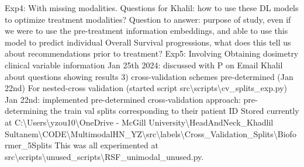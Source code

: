 \documentclass{article}%
\begin{document}
\newline%
\newline%
%
Exp4:  With missing modalities. %
\newline%
\newline%
%
Questions for Khalil: how to use these DL models to optimize treatment modalities? %
\newline%
\newline%
%
Question to answer: purpose of study, even if we were to use the pre{-}treatment information embeddings, and able to use this model to predict individual Overall Survival progressions, what does this tell us about recommendations prior to treatment? %
\newline%
\newline%
%
Exp5: Involving %
\newline%
\newline%
%
Obtaining dosimetry clinical variable information %
\newline%
\newline%
%
Jan 25th 2024: discussed with P on %
\newline%
\newline%
%
Email Khalil about questions showing results %
\newline%
\newline%
%
%
\newline%
\newline%
%
3) cross{-}validation schemes pre{-}determined (Jan 22nd) %
\newline%
\newline%
%
For nested{-}cross validation (started script src\textbackslash{}scripts\textbackslash{}cv\_splits\_exp.py)%
\newline%
\newline%
%
Jan 22nd: implemented pre{-}determined cross{-}validation approach: pre{-}determining the train val splits corresponding to their patient ID%
\newline%
\newline%
%
Stored currently at C:\textbackslash{}Users\textbackslash{}yzou10\textbackslash{}OneDrive {-} McGill University\textbackslash{}HeadAndNeck\_Khadlil Sultanem\textbackslash{}CODE\textbackslash{}MultimodalHN\_YZ\textbackslash{}src\textbackslash{}labels\textbackslash{}Cross\_Validation\_Splits\textbackslash{}Bioformer\_5Splits %
\newline%
\newline%
%
This was all experimented at src\textbackslash{}scripts\textbackslash{}unused\_scripts\textbackslash{}RSF\_unimodal\_unused.py. %
\end{document}
